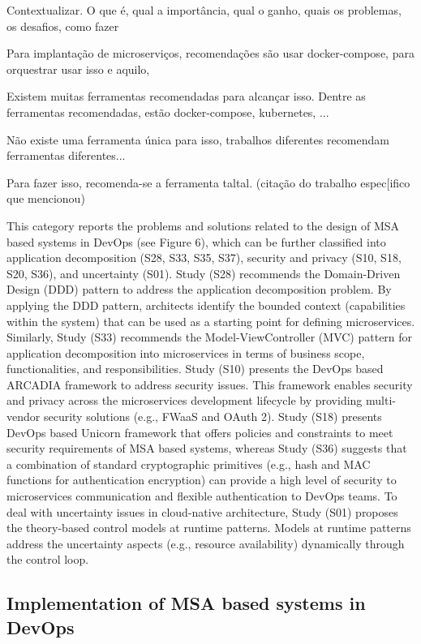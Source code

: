 Contextualizar. O que é, qual a importância, qual o ganho, quais os problemas, os desafios, como fazer

Para implantação de microserviços, recomendações são usar docker-compose, para orquestrar usar isso e aquilo,

Existem muitas ferramentas recomendadas para alcançar isso. Dentre as ferramentas recomendadas, estão docker-compose, kubernetes, ...

Não existe uma ferramenta única para isso, trabalhos diferentes recomendam ferramentas diferentes...

Para fazer isso, recomenda-se a ferramenta taltal. (citação do trabalho espec[ifico que mencionou)

This category reports the problems and solutions related to the design of MSA based systems in DevOps (see Figure 6), which can be further classified into application decomposition (S28, S33, S35, S37), security and privacy (S10, S18, S20, S36), and uncertainty (S01). Study (S28) recommends the Domain-Driven Design (DDD) pattern to address the application decomposition problem. By applying the DDD pattern, architects identify the bounded context (capabilities within the system) that can be used as a starting point for defining microservices. Similarly, Study (S33) recommends the Model-ViewController (MVC) pattern for application decomposition into microservices in terms of business scope, functionalities, and responsibilities. Study (S10) presents the DevOps based ARCADIA framework to address security issues. This framework enables security and privacy across the microservices development lifecycle by providing multi-vendor security solutions (e.g., FWaaS and OAuth 2). Study (S18) presents DevOps based Unicorn framework that offers policies and constraints to meet security requirements of MSA based systems, whereas Study (S36) suggests that a combination of standard cryptographic primitives (e.g., hash and MAC functions for authentication encryption) can provide a high level of security to microservices communication and flexible authentication to DevOps teams. To deal with uncertainty issues in cloud-native architecture, Study (S01) proposes the theory-based control models at runtime patterns. Models at runtime patterns address the uncertainty aspects (e.g., resource availability) dynamically through the control loop.

\subsection{Implementation of MSA based systems in DevOps}


